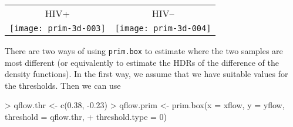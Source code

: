 \documentclass[a4paper,11pt]{article}
\begin{document}
\begin{center}
\begin{tabular}{cc}
HIV+ & HIV-- \\
\texttt{[image: prim-3d-003]}
&
\texttt{[image: prim-3d-004]}
\end{tabular}
\end{center}

There are two ways of using \texttt{prim.box} to estimate where the 
two samples are most different (or equivalently 
to estimate the HDRs of the difference of the density functions). 
In the first way, we assume that we have suitable
values for the thresholds. Then we can use
\begin{Schunk}
\begin{Sinput}
> qflow.thr <- c(0.38, -0.23)
> qflow.prim <- prim.box(x = xflow, y = yflow, threshold = qflow.thr, 
+     threshold.type = 0)
\end{Sinput}
\end{Schunk}
\end{document}

